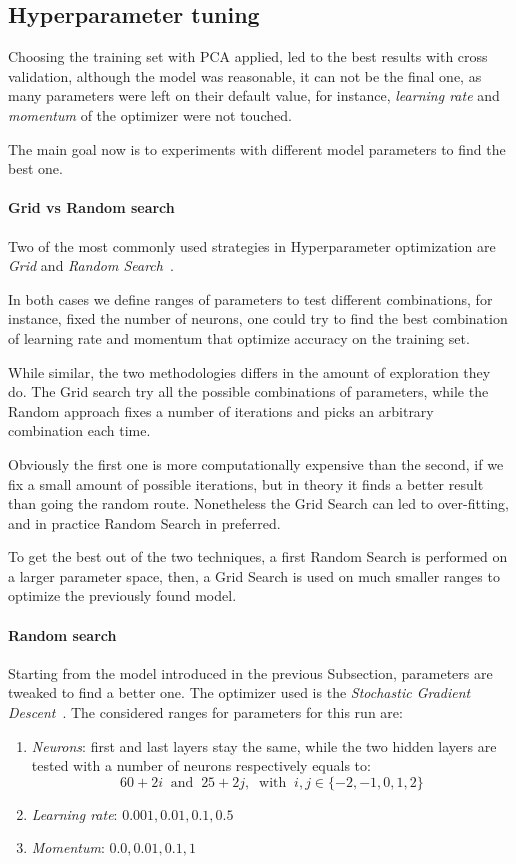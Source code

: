 \subsection{Hyperparameter tuning}

Choosing the training set with PCA applied, led to the best results 
with cross validation, although the model was reasonable, it can not be the 
final one, as many parameters were left on their default value, for instance, 
\emph{learning rate} and \emph{momentum} of the optimizer were not touched. 

The main goal now is to experiments with different model parameters 
to find the best one.

\paragraph{Grid vs Random search}
Two of the most commonly used strategies in Hyperparameter optimization
are \emph{Grid} and \emph{Random Search}~\cite{random-grid}. 

In both cases we define ranges of parameters to test different combinations, 
for instance, fixed the number of neurons, one could try to find the best 
combination of learning rate and momentum that optimize accuracy on the training set.

While similar, the two methodologies differs in the amount of exploration they do.
The Grid search try all the possible combinations of parameters, while the 
Random approach fixes a number of iterations and picks an arbitrary combination each time. 

Obviously the first one is more computationally expensive than the second, if 
we fix a small amount of possible iterations, but in theory it finds a better result
than going the random route. 
Nonetheless the Grid Search can led to over-fitting, and in practice Random 
Search in preferred.

To get the best out of the two techniques, a first Random Search is performed 
on a larger parameter space, then, a Grid Search is used on much smaller 
ranges to optimize the previously found model.

\paragraph{Random search}
Starting from the model introduced in the previous Subsection, parameters are 
tweaked to find a better one.
The optimizer used is the \emph{Stochastic Gradient Descent}~\cite{sgd}.
The considered ranges for parameters for this run are: 
\begin{enumerate}
    \item \emph{Neurons}: first and last layers stay the same, while 
    the two hidden layers are tested with a number of neurons respectively 
    equals to: 
    $$60 + 2i\;\;\text{and}\;\;25 + 2j,\;\;\text{with}\;\; i, j \in \{-2,-1,0,1,2\}$$
    \item \emph{Learning rate}: $0.001, 0.01, 0.1, 0.5$
    \item \emph{Momentum}: $0.0, 0.01, 0.1, 1$
\end{enumerate}

